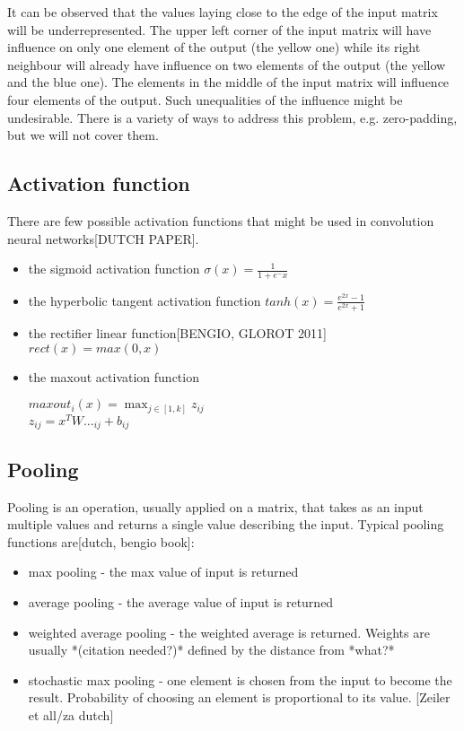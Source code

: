 \documentclass[a4paper,10pt]{report}
\begin{document}
	  It can be observed that the values laying close to the edge of the input matrix will be underrepresented. The upper left corner of the input matrix will have influence on only one element of the output (the yellow one) while its right neighbour will already have influence on two elements of the output (the yellow and the blue one). The elements in the middle of the input matrix will influence four elements of the output. Such unequalities of the influence might be undesirable. There is a variety of ways to address this problem, e.g. zero-padding, but we will not cover them.\\
	  
	  
	\subsection{Activation function}
	  There are few possible activation functions that might be used in convolution neural networks[DUTCH PAPER].
	  \begin{itemize}
	   \item the sigmoid activation function $\sigma(x) = \frac{1}{1 + e^-x}$
	   \item the hyperbolic tangent activation function $tanh(x) = \frac{e^{2x} - 1}{e^{2x} + 1}$
	   \item the rectifier linear function[BENGIO, GLOROT 2011] $rect(x) = max(0,x)$ %
	   \item the maxout activation function
	    \begin{center}
	      $maxout_i(x) = \max_{j \in [1, k]}z_{ij}$\\
	      $z_{ij}=x^TW..._{ij} + b_{ij} $ %
	    \end{center}
	  \end{itemize}

	
	\subsection{Pooling}
	  Pooling is an operation, usually applied on a matrix, that takes as an input multiple values and returns a single value describing the input. Typical pooling functions are[dutch, bengio book]:
	  \begin{itemize}
	    \item max pooling - the max value of input is returned
	    \item average pooling - the average value of input is returned
	    \item weighted average pooling - the weighted average is returned. Weights are usually *(citation needed?)* defined by the distance from *what?* %
	    \item stochastic max pooling - one element is chosen from the input to become the result. Probability of choosing an element is proportional to its value. [Zeiler et all/za dutch]\\
	  \end{itemize}
	  
\end{document}
